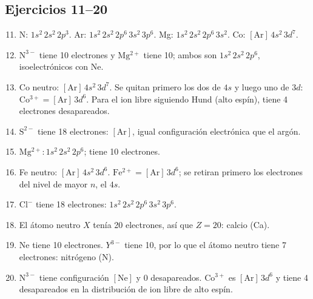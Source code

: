 \documentclass[12pt, letterpaper]{article}
\begin{document}
\subsection*{Ejercicios 11--20}
\begin{enumerate}[leftmargin=*, label=\textbf{\arabic*.}]
  \setcounter{enumi}{10}
  \item N: $1s^2\,2s^2\,2p^3$. Ar: $1s^2\,2s^2\,2p^6\,3s^2\,3p^6$. Mg: $1s^2\,2s^2\,2p^6\,3s^2$. Co: $[\mathrm{Ar}]\,4s^2\,3d^7$.
  \item $\mathrm{N^{3-}}$ tiene 10 electrones y $\mathrm{Mg^{2+}}$ tiene 10; ambos son $1s^2\,2s^2\,2p^6$, isoelectrónicos con Ne.
  \item Co neutro: $[\mathrm{Ar}]\,4s^2\,3d^7$. Se quitan primero los dos de $4s$ y luego uno de $3d$: $\mathrm{Co^{3+}}=[\mathrm{Ar}]\,3d^6$. Para el ion libre siguiendo Hund (alto espín), tiene 4 electrones desapareados.
  \item $\mathrm{S^{2-}}$ tiene 18 electrones: $[\mathrm{Ar}]$, igual configuración electrónica que el argón.
  \item $\mathrm{Mg^{2+}}:1s^2\,2s^2\,2p^6$; tiene 10 electrones.
  \item Fe neutro: $[\mathrm{Ar}]\,4s^2\,3d^6$. $\mathrm{Fe^{2+}}=[\mathrm{Ar}]\,3d^6$; se retiran primero los electrones del nivel de mayor $n$, el $4s$.
  \item $\mathrm{Cl^-}$ tiene 18 electrones: $1s^2\,2s^2\,2p^6\,3s^2\,3p^6$.
  \item El átomo neutro $X$ tenía 20 electrones, así que $Z=20$: calcio (Ca).
  \item Ne tiene 10 electrones. $Y^{3-}$ tiene 10, por lo que el átomo neutro tiene 7 electrones: nitrógeno (N).
  \item $\mathrm{N^{3-}}$ tiene configuración $[\mathrm{Ne}]$ y 0 desapareados. $\mathrm{Co^{3+}}$ es $[\mathrm{Ar}]\,3d^6$ y tiene 4 desapareados en la distribución de ion libre de alto espín.
\end{enumerate}
\end{document}

